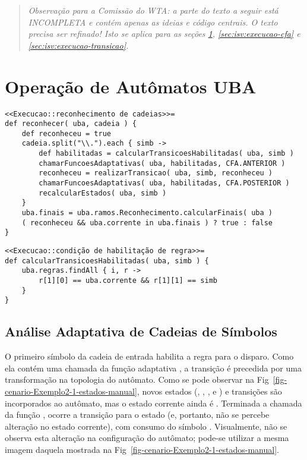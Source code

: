 
   \begin{quote}
   \textit{Observação para a Comissão do WTA: a parte do texto a seguir está INCOMPLETA e contém apenas as ideias e código centrais. O texto precisa ser refinado! Isto se aplica para as seções \ref{sec:isv:execucao-uba}, \ref{sec:isv:execucao-cfa} e \ref{sec:isv:execucao-transicao}.}
   \end{quote}

\section{Operação de Autômatos UBA}
\label{sec:isv:execucao-uba}


\begin{lstlisting}
<<Execucao::reconhecimento de cadeias>>=
def reconhecer( uba, cadeia ) {
    def reconheceu = true
    cadeia.split("\\.").each { simb ->
        def habilitadas = calcularTransicoesHabilitadas( uba, simb )
        chamarFuncoesAdaptativas( uba, habilitadas, CFA.ANTERIOR )
        reconheceu = realizarTransicao( uba, simb, reconheceu )
        chamarFuncoesAdaptativas( uba, habilitadas, CFA.POSTERIOR )
        recalcularEstados( uba, simb )
    }
    uba.finais = uba.ramos.Reconhecimento.calcularFinais( uba )
    ( reconheceu && uba.corrente in uba.finais ) ? true : false
}
\end{lstlisting}


\begin{lstlisting}
<<Execucao::condição de habilitação de regra>>=
def calcularTransicoesHabilitadas( uba, simb ) {
    uba.regras.findAll { i, r ->
        r[1][0] == uba.corrente && r[1][1] == simb
    }
}
\end{lstlisting}

\subsection*{Análise Adaptativa de Cadeias de Símbolos}


O primeiro símbolo  da cadeia de entrada habilita a regra  para o disparo. Como ela contém uma chamada da função adaptativa , a transição é precedida por uma transformação na topologia do autômato. Como se pode observar na Fig~\ref{fig-cenario-Exemplo2-1-estados-manual}, novos estados (, , ,  e ) e transições são incorporados ao autômato, mas o estado corrente ainda é . Terminada a chamada da função , ocorre a transição para o estado  (e, portanto, não se percebe alteração no estado corrente), com consumo do símbolo . Visualmente, não se observa esta alteração na configuração do autômato; pode-se utilizar a mesma imagem daquela mostrada na Fig~\ref{fig-cenario-Exemplo2-1-estados-manual}.

